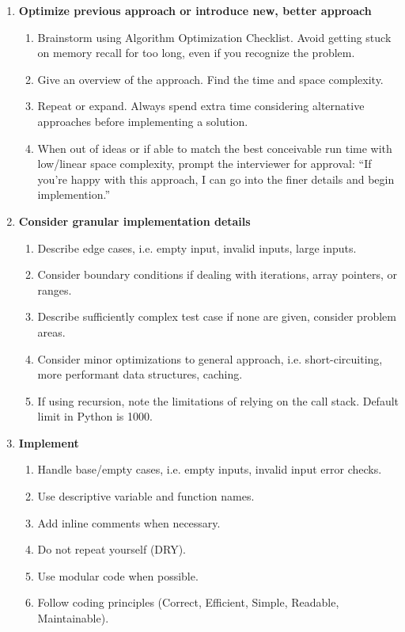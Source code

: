 \documentclass{article}
\begin{document}
\begin{enumerate}
     \item \textbf{Optimize previous approach or introduce new, better approach}

    \begin{enumerate}
        \item Brainstorm using Algorithm Optimization Checklist. Avoid getting stuck on memory recall for too long, even if you recognize the problem.
        \item Give an overview of the approach. Find the time and space complexity.
        \item Repeat or expand. Always spend extra time considering alternative approaches before implementing a solution.
        \item When out of ideas or if able to match the best conceivable run time with low/linear space complexity, prompt the interviewer for approval: ``If you're happy with this approach, I can go into the finer details and begin implemention.''
    \end{enumerate}
    
     \item \textbf{Consider granular implementation details}

    \begin{enumerate}
        \item Describe edge cases, i.e. empty input, invalid inputs, large inputs.
        \item Consider boundary conditions if dealing with iterations, array pointers, or ranges.
        \item Describe sufficiently complex test case if none are given, consider problem areas.
        \item Consider minor optimizations to general approach, i.e. short-circuiting, more performant data structures, caching.
        \item If using recursion, note the limitations of relying on the call stack. Default limit in Python is 1000.
    \end{enumerate}
    
    \item \textbf{Implement}
    \begin{enumerate}
        \item Handle base/empty cases, i.e. empty inputs, invalid input error checks.
        \item Use descriptive variable and function names.
        \item Add inline comments when necessary.
        \item Do not repeat yourself (DRY).
        \item Use modular code when possible.
        \item Follow coding principles (Correct, Efficient, Simple, Readable, Maintainable).
    \end{enumerate}
    

\end{enumerate}
\end{document}
